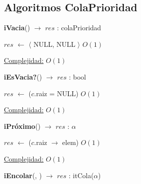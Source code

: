 \begin{Algoritmos}
\subsection{Algoritmos ColaPrioridad}


\begin{algorithm}[H]
{\textbf{iVacia}() $\to$ $res$ : colaPrioridad}
\begin{algorithmic}[1]
    \State $res$ $\gets$  $\langle$ NULL, NULL $\rangle$   \Comment $O(1)$

    \medskip
    \Statex \underline{Complejidad:} $O(1)$
\end{algorithmic}
\end{algorithm}


\begin{algorithm}[H]
{\textbf{iEsVacia?}() $\to$ $res$ : bool}
\begin{algorithmic}[1]
    \State $res$ $\gets$ ($c$.raiz = NULL) \Comment $O(1)$

    \medskip
    \Statex \underline{Complejidad:} $O(1)$
\end{algorithmic}
\end{algorithm}


\begin{algorithm}[H]
{\textbf{iPr\'oximo}() $\to$ $res$ : $\alpha$}
\begin{algorithmic}[1]
    \State $res$ $\gets$ ($c$.raiz $\rightarrow$ elem) \Comment $O(1)$

    \medskip
    \Statex \underline{Complejidad:} $O(1)$
\end{algorithmic}
\end{algorithm}


{\textbf{iEncolar}(, ) $\to$ $res$ : itCola($\alpha$)}
\begin{algorithmic}[1]


\end{algorithmic}
\end{Algoritmos}
